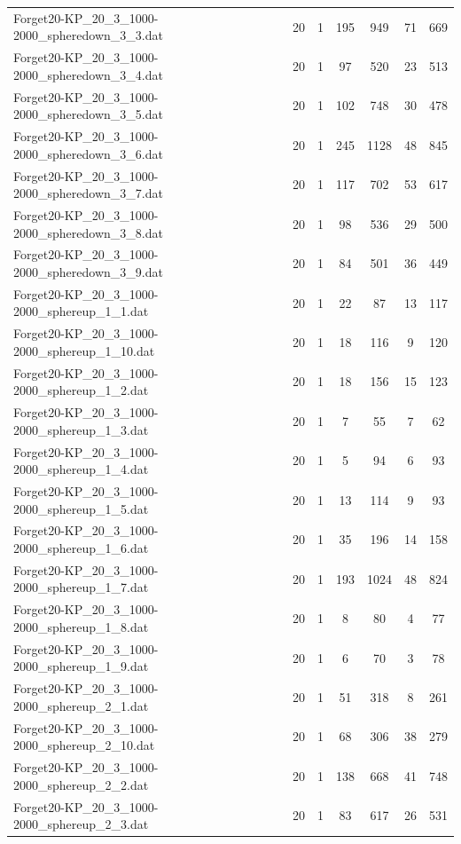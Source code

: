 \begin{table}[!ht]
\begin{tabular}{lcccccc}
Forget20-KP\_20\_3\_1000-2000\_spheredown\_3\_3.dat & 20 & 1 & 195 & 949 & 71 & 669 \\
Forget20-KP\_20\_3\_1000-2000\_spheredown\_3\_4.dat & 20 & 1 & 97 & 520 & 23 & 513 \\
Forget20-KP\_20\_3\_1000-2000\_spheredown\_3\_5.dat & 20 & 1 & 102 & 748 & 30 & 478 \\
Forget20-KP\_20\_3\_1000-2000\_spheredown\_3\_6.dat & 20 & 1 & 245 & 1128 & 48 & 845 \\
Forget20-KP\_20\_3\_1000-2000\_spheredown\_3\_7.dat & 20 & 1 & 117 & 702 & 53 & 617 \\
Forget20-KP\_20\_3\_1000-2000\_spheredown\_3\_8.dat & 20 & 1 & 98 & 536 & 29 & 500 \\
Forget20-KP\_20\_3\_1000-2000\_spheredown\_3\_9.dat & 20 & 1 & 84 & 501 & 36 & 449 \\
Forget20-KP\_20\_3\_1000-2000\_sphereup\_1\_1.dat & 20 & 1 & 22 & 87 & 13 & 117 \\
Forget20-KP\_20\_3\_1000-2000\_sphereup\_1\_10.dat & 20 & 1 & 18 & 116 & 9 & 120 \\
Forget20-KP\_20\_3\_1000-2000\_sphereup\_1\_2.dat & 20 & 1 & 18 & 156 & 15 & 123 \\
Forget20-KP\_20\_3\_1000-2000\_sphereup\_1\_3.dat & 20 & 1 & 7 & 55 & 7 & 62 \\
Forget20-KP\_20\_3\_1000-2000\_sphereup\_1\_4.dat & 20 & 1 & 5 & 94 & 6 & 93 \\
Forget20-KP\_20\_3\_1000-2000\_sphereup\_1\_5.dat & 20 & 1 & 13 & 114 & 9 & 93 \\
Forget20-KP\_20\_3\_1000-2000\_sphereup\_1\_6.dat & 20 & 1 & 35 & 196 & 14 & 158 \\
Forget20-KP\_20\_3\_1000-2000\_sphereup\_1\_7.dat & 20 & 1 & 193 & 1024 & 48 & 824 \\
Forget20-KP\_20\_3\_1000-2000\_sphereup\_1\_8.dat & 20 & 1 & 8 & 80 & 4 & 77 \\
Forget20-KP\_20\_3\_1000-2000\_sphereup\_1\_9.dat & 20 & 1 & 6 & 70 & 3 & 78 \\
Forget20-KP\_20\_3\_1000-2000\_sphereup\_2\_1.dat & 20 & 1 & 51 & 318 & 8 & 261 \\
Forget20-KP\_20\_3\_1000-2000\_sphereup\_2\_10.dat & 20 & 1 & 68 & 306 & 38 & 279 \\
Forget20-KP\_20\_3\_1000-2000\_sphereup\_2\_2.dat & 20 & 1 & 138 & 668 & 41 & 748 \\
Forget20-KP\_20\_3\_1000-2000\_sphereup\_2\_3.dat & 20 & 1 & 83 & 617 & 26 & 531 \\

\end{tabular}
\end{table}
